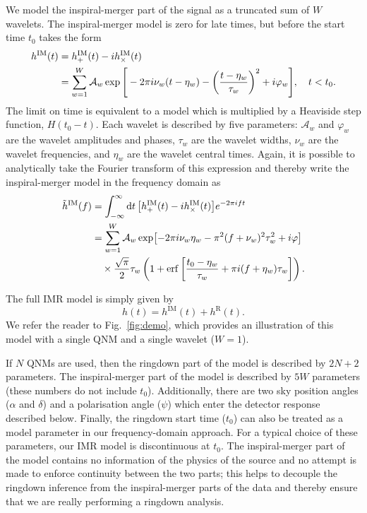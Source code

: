 We model the inspiral-merger part of the signal as a truncated sum of $W$ wavelets.
The inspiral-merger model is zero for late times, but before the start time $t_0$ takes the form
\begin{align}
	h^\mathrm{IM}(t) &=  h_+^\mathrm{IM}(t) - ih_\times^\mathrm{IM}(t) \nonumber \\
	&= \sum_{w=1}^{W} \mathcal{A}_w \exp \Bigg[-2\pi i \nu_w(t-\eta_w) - \qty(\frac{t-\eta_w}{\tau_w})^2 + i\varphi_w \Bigg], \quad t < t_0.
\end{align}
The limit on time is equivalent to a model which is multiplied by a Heaviside step function, $H(t_0 - t)$. Each wavelet is described by five parameters: $\mathcal{A}_w$ and $\varphi_w$ are the wavelet amplitudes and phases, $\tau_w$ are the wavelet widths, $\nu_w$ are the wavelet frequencies, and $\eta_w$ are the wavelet central times. Again, it is possible to analytically take the Fourier transform of this expression and thereby write the inspiral-merger model in the frequency domain as
\begin{align}
	\Tilde{h}^\mathrm{IM}(f) &= \int_{-\infty}^\infty \dd{t} \qty[h_+^\mathrm{IM}(t) - ih_\times^\mathrm{IM}(t)] e^{-2\pi i f t} \\
	&= \sum_{w=1}^{W} \mathcal{A}_w \exp[-2\pi i\nu_w \eta_w -\pi^2(f+\nu_w)^2\tau_w^2 +i\varphi] \nonumber\\
	&\quad\times \frac{\sqrt{\pi}}{2}\tau_w \left(1 + \mathrm{erf} \left[ \frac{t_0-\eta_w}{\tau_w} + \pi i(f+\eta_w)\tau_w \right] \right).\nonumber
\end{align}

The full IMR model is simply given by
\begin{equation}
	h(t) = h^\mathrm{IM}(t) + h^\mathrm{R}(t).
\end{equation}
We refer the reader to Fig.~\ref{fig:demo}, which provides an illustration of this model with a single QNM and a single wavelet ($W=1$).

If $N$ QNMs are used, then the ringdown part of the model is described by $2N+2$ parameters.
The inspiral-merger part of the model is described by $5W$ parameters (these numbers do not include $t_0$).
Additionally, there are two sky position angles ($\alpha$ and $\delta$) and a polarisation angle ($\psi$) which enter the detector response described below.
Finally, the ringdown start time ($t_0$) can also be treated as a model parameter in our frequency-domain approach.
For a typical choice of these parameters, our IMR model is discontinuous at $t_0$.
The inspiral-merger part of the model contains no information of the physics of the source and no attempt is made to enforce continuity between the two parts; this helps to decouple the ringdown inference from the inspiral-merger parts of the data and thereby ensure that we are really performing a ringdown analysis. 

